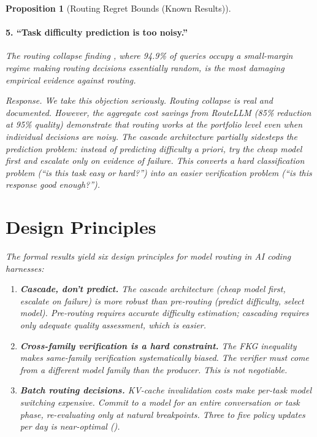 \documentclass[11pt, a4paper, copyright]{googledeepmind}
\newtheorem{proposition}{Proposition}[section]
\begin{document}
\begin{proposition}[Routing Regret Bounds (Known Results)]
\paragraph{5. ``Task difficulty prediction is too noisy.''} The routing collapse finding \citep{routingcollapse2026}, where 94.9\% of queries occupy a small-margin regime making routing decisions essentially random, is the most damaging empirical evidence against routing.

\emph{Response.} We take this objection seriously. Routing collapse is real and documented. However, the aggregate cost savings from RouteLLM (85\% reduction at 95\% quality) demonstrate that routing works at the portfolio level even when individual decisions are noisy. The cascade architecture partially sidesteps the prediction problem: instead of predicting difficulty \emph{a priori}, try the cheap model first and escalate only on evidence of failure. This converts a hard classification problem (``is this task easy or hard?'') into an easier verification problem (``is this response good enough?'').


\section{Design Principles}
\label{sec:principles}

The formal results yield six design principles for model routing in AI coding harnesses:

\begin{enumerate}
\item \textbf{Cascade, don't predict.} The cascade architecture (cheap model first, escalate on failure) is more robust than pre-routing (predict difficulty, select model). Pre-routing requires accurate difficulty estimation; cascading requires only adequate quality assessment, which is easier.

\item \textbf{Cross-family verification is a hard constraint.} The FKG inequality makes same-family verification systematically biased. The verifier must come from a different model family than the producer. This is not negotiable.

\item \textbf{Batch routing decisions.} KV-cache invalidation costs make per-task model switching expensive. Commit to a model for an entire conversation or task phase, re-evaluating only at natural breakpoints. Three to five policy updates per day is near-optimal ().


\end{enumerate}
\end{proposition}
\end{document}
